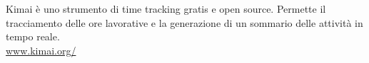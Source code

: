 Kimai è uno strumento di time tracking gratis e open source. Permette il tracciamento delle ore lavorative e la generazione di un sommario delle attività in tempo reale.\\
\url{www.kimai.org/}
\clearpage